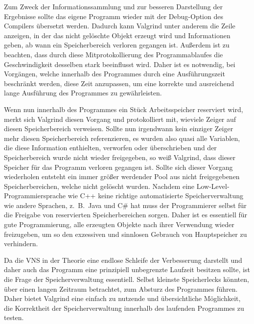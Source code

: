 Zum Zweck der Informationssammlung und zur besseren Darstellung der Ergebnisse sollte das eigene Programm wieder mit der Debug-Option des Compilers übersetzt werden. Dadurch kann Valgrind unter anderem die Zeile
anzeigen, in der das nicht gelöschte Objekt erzeugt wird und Informationen geben, ab wann ein Speicherbereich verloren gegangen ist. Außerdem ist zu beachten, dass durch diese Mitprotokollierung des 
Programmablaufes die Geschwindigkeit desselben stark beeinflusst wird. Daher ist es notwendig, bei Vorgängen, welche innerhalb des Programmes durch eine Ausführungszeit beschränkt werden, diese Zeit anzupassen, 
um eine korrekte und ausreichend lange Ausführung des Programmes zu gewährleisten. 

Wenn nun innerhalb des Programmes ein Stück Arbeitsspeicher reserviert wird, merkt sich Valgrind diesen Vorgang und protokolliert mit, wieviele Zeiger auf diesen Speicherbereich verweisen. Sollte nun irgendwann
kein einziger Zeiger mehr diesen Speicherbereich referenzieren, es wurden also quasi alle Variablen, die diese Information enthielten, verworfen oder überschrieben und der Speicherbereich wurde nicht wieder
freigegeben, so weiß Valgrind, dass dieser Speicher für das Programm verloren gegangen ist. Sollte sich dieser Vorgang wiederholen entsteht ein immer größer werdender Pool aus nicht freigegebenen Speicherbereichen, welche
nicht gelöscht wurden. Nachdem eine Low-Level-Programmiersprache wie C++ keine richtige automatisierte Speicherverwaltung wie andere Sprachen, z.~B.\ Java und C\# hat muss der Programmierer selbst für die 
Freigabe von reservierten Speicherbereichen sorgen. Daher ist es essentiell für gute Programmierung, alle erzeugten Objekte nach ihrer Verwendung wieder freizugeben, um so den exzessiven und sinnlosen Gebrauch von
Hauptspeicher zu verhindern.

\singlespacing


Da die VNS in der Theorie eine endlose Schleife der Verbesserung darstellt und daher auch das Programm eine prinzipiell unbegrenzte Laufzeit besitzen sollte, ist die Frage der Spei\-cher\-ver\-walt\-ung essentiell.
Selbst kleinste Speicherlecks könnten, über einen langen Zeitraum betrachtet, zum Absturz des Programmes führen. Daher bietet Valgrind eine einfach zu nutzende und übersichtliche Möglichkeit, die Korrektheit
der Speicherverwaltung innerhalb des laufenden Programmes zu testen. 

